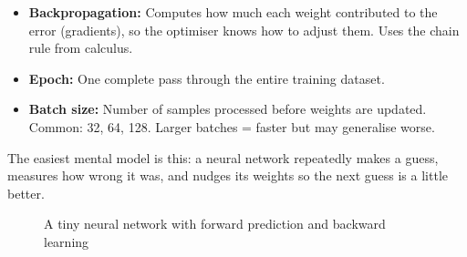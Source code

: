 \documentclass[12pt, a4paper, oneside]{book}
\begin{document}
\begin{itemize}[leftmargin=2em]
\begin{itemize}
        \item \textbf{Learning rate:} How big each weight update step is. Too high = oscillate and never converge. Too low = train forever. Typical starting value: $10^{-3}$ for Adam.
    \end{itemize}
    \item \textbf{Backpropagation:} Computes how much each weight contributed to the error (gradients), so the optimiser knows how to adjust them. Uses the chain rule from calculus.
    \item \textbf{Epoch:} One complete pass through the entire training dataset.
    \item \textbf{Batch size:} Number of samples processed before weights are updated. Common: 32, 64, 128. Larger batches = faster but may generalise worse.
\end{itemize}

\begin{intuitionbox}
The easiest mental model is this: a neural network repeatedly makes a guess, measures how wrong it was, and nudges its weights so the next guess is a little better.
\end{intuitionbox}

\begin{figure}[H]
\centering
{}
\caption{A tiny neural network with forward prediction and backward learning}
\label{fig:tiny-neural-network}
\end{figure}
\end{document}
